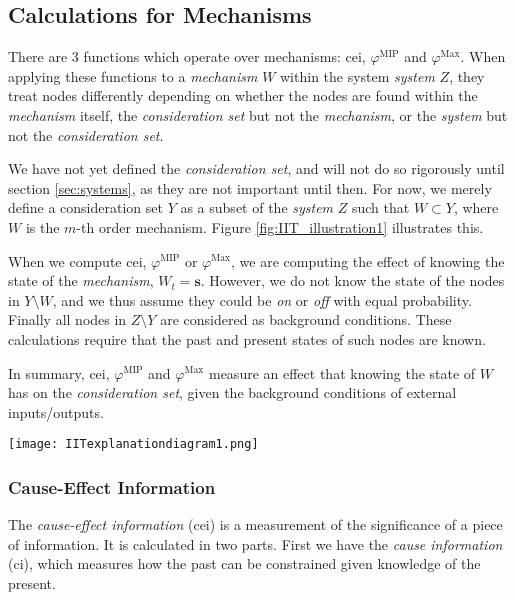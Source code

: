 \subsection{Calculations for Mechanisms}\label{sec:little_phi}
There are 3 functions which operate over mechanisms: cei, $\varphi^{\text{MIP}}$ and $\varphi^{\text{Max}}$. When applying these functions to a \textit{mechanism} $W$ within the system \textit{system} $Z$, they treat nodes differently depending on whether the nodes are found within the \textit{mechanism} itself, the \textit{consideration set} but not the \textit{mechanism}, or the \textit{system} but not the \textit{consideration set}.

We have not yet defined the \textit{consideration set}, and will not do so rigorously until section \ref{sec:systems}, as they are not important until then. For now, we merely define a consideration set $Y$ as a subset of the \textit{system} $Z$ such that $W \subset Y$, where $W$ is the $m$-th order mechanism. Figure \ref{fig:IIT_illustration1} illustrates this.


When we compute cei, $\varphi^{\text{MIP}}$ or $\varphi^{\text{Max}}$, we are computing the effect of knowing the state of the \textit{mechanism}, $W_t = \mathbf{s}$. However, we do not know the state of the nodes in $Y\setminus W$, and we thus assume they could be \textit{on} or \textit{off} with equal probability. Finally all nodes in $Z \setminus Y$ are considered as background conditions. These calculations require that the past and present states of such nodes are known. 

In summary, cei, $\varphi^{\text{MIP}}$ and $\varphi^{\text{Max}}$ measure an effect that knowing the state of $W$ has on the \textit{consideration set}, given the background conditions of external inputs/outputs.


\begin{SCfigure}
	\centering
	\texttt{[image: IITexplanationdiagram1.png]}
	\caption{In this illustration, we identify the mechanism $CD$ by circling it in red. The \textit{consideration set} is similarly circled in green. Finally, all remaining nodes of the system which lie outside of the \textit{consideration set} are external inputs/outputs.}
	\label{fig:IIT_illustration1}
\end{SCfigure}

\subsubsection{Cause-Effect Information}
\label{sec:cei}
The \textit{cause-effect information} (cei) is a measurement of the significance of a piece of information. It is calculated in two parts. First we have the \textit{cause information} (ci), which measures how the past can be constrained given knowledge of the present. 

